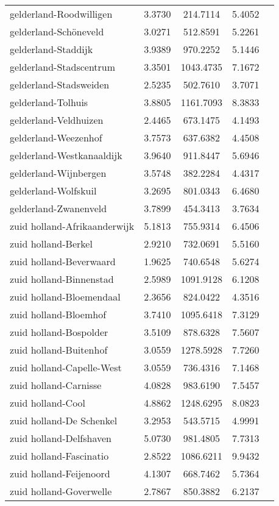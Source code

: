\begin{longtable}{llccc}
gelderland-Roodwilligen & 3.3730 & 214.7114 & 5.4052 \\
gelderland-Schöneveld & 3.0271 & 512.8591 & 5.2261 \\
gelderland-Staddijk & 3.9389 & 970.2252 & 5.1446 \\
gelderland-Stadscentrum & 3.3501 & 1043.4735 & 7.1672 \\
gelderland-Stadsweiden & 2.5235 & 502.7610 & 3.7071 \\
gelderland-Tolhuis & 3.8805 & 1161.7093 & 8.3833 \\
gelderland-Veldhuizen & 2.4465 & 673.1475 & 4.1493 \\
gelderland-Weezenhof & 3.7573 & 637.6382 & 4.4508 \\
gelderland-Westkanaaldijk & 3.9640 & 911.8447 & 5.6946 \\
gelderland-Wijnbergen & 3.5748 & 382.2284 & 4.4317 \\
gelderland-Wolfskuil & 3.2695 & 801.0343 & 6.4680 \\
gelderland-Zwanenveld & 3.7899 & 454.3413 & 3.7634 \\
zuid holland-Afrikaanderwijk & 5.1813 & 755.9314 & 6.4506 \\
zuid holland-Berkel & 2.9210 & 732.0691 & 5.5160 \\
zuid holland-Beverwaard & 1.9625 & 740.6548 & 5.6274 \\
zuid holland-Binnenstad & 2.5989 & 1091.9128 & 6.1208 \\
zuid holland-Bloemendaal & 2.3656 & 824.0422 & 4.3516 \\
zuid holland-Bloemhof & 3.7410 & 1095.6418 & 7.3129 \\
zuid holland-Bospolder & 3.5109 & 878.6328 & 7.5607 \\
zuid holland-Buitenhof & 3.0559 & 1278.5928 & 7.7260 \\
zuid holland-Capelle-West & 3.0559 & 736.4316 & 7.1468 \\
zuid holland-Carnisse & 4.0828 & 983.6190 & 7.5457 \\
zuid holland-Cool & 4.8862 & 1248.6295 & 8.0823 \\
zuid holland-De Schenkel & 3.2953 & 543.5715 & 4.9991 \\
zuid holland-Delfshaven & 5.0730 & 981.4805 & 7.7313 \\
zuid holland-Fascinatio & 2.8522 & 1086.6211 & 9.9432 \\
zuid holland-Feijenoord & 4.1307 & 668.7462 & 5.7364 \\
zuid holland-Goverwelle & 2.7867 & 850.3882 & 6.2137 \\

\end{longtable}
